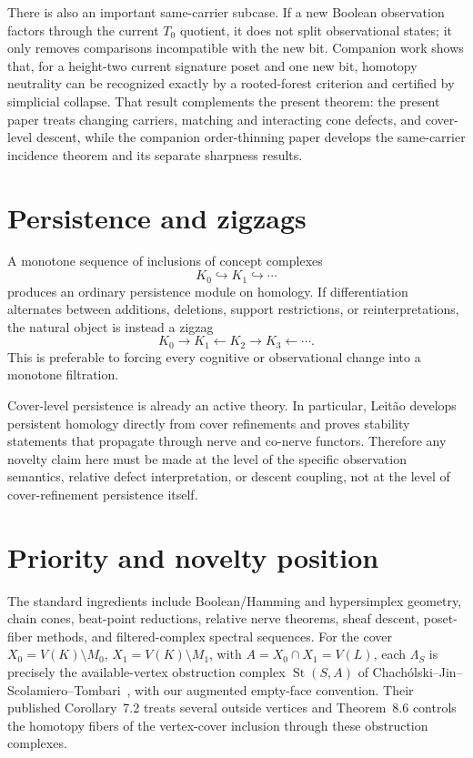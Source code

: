 \documentclass[11pt]{article}
\begin{document}
There is also an important same-carrier subcase.  If a new Boolean observation factors through the current $T_0$ quotient, it does not split observational states; it only removes comparisons incompatible with the new bit.  Companion work shows that, for a height-two current signature poset and one new bit, homotopy neutrality can be recognized exactly by a rooted-forest criterion and certified by simplicial collapse.  That result complements the present theorem: the present paper treats changing carriers, matching and interacting cone defects, and cover-level descent, while the companion order-thinning paper develops the same-carrier incidence theorem and its separate sharpness results.

\section{Persistence and zigzags}

A monotone sequence of inclusions of concept complexes
\[
K_0\hookrightarrow K_1\hookrightarrow\cdots
\]
produces an ordinary persistence module on homology.  If differentiation alternates between additions, deletions, support restrictions, or reinterpretations, the natural object is instead a zigzag
\[
K_0\to K_1\leftarrow K_2\to K_3\leftarrow\cdots.
\]
This is preferable to forcing every cognitive or observational change into a monotone filtration.

Cover-level persistence is already an active theory.  In particular, Leit\~ao develops persistent homology directly from cover refinements and proves stability statements that propagate through nerve and co-nerve functors.  Therefore any novelty claim here must be made at the level of the specific observation semantics, relative defect interpretation, or descent coupling, not at the level of cover-refinement persistence itself.

\section{Priority and novelty position}
The standard ingredients include Boolean/Hamming and hypersimplex geometry,
chain cones, beat-point reductions, relative nerve theorems, sheaf descent,
poset-fiber methods, and filtered-complex spectral sequences.
For the cover $X_0=V(K)\setminus M_0$, $X_1=V(K)\setminus M_1$, with
$A=X_0\cap X_1=V(L)$, each $\Lambda_S$ is precisely the available-vertex
obstruction complex $\operatorname{St}(S,A)$ of
Chach\'olski--Jin--Scolamiero--Tombari~\cite{ChacholskiEtAl2021}, with
our augmented empty-face convention.  Their published Corollary~7.2 treats
several outside vertices and Theorem~8.6 controls the homotopy fibers of the
vertex-cover inclusion through these obstruction complexes.
\end{document}
